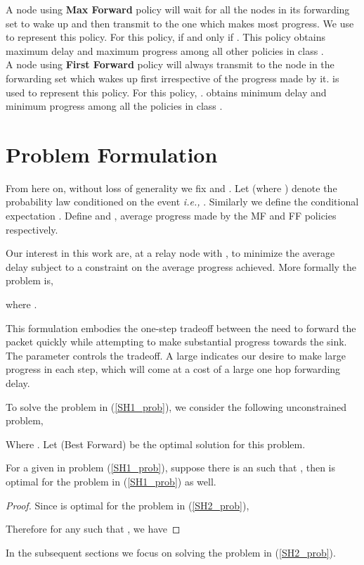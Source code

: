 \documentclass[onecolumn]{IEEEtran}
\begin{document}
\noindent
A node using \textbf{Max Forward} policy will wait for all the  nodes in its forwarding set to wake up and then transmit to the one which makes  most progress. We use  to represent this policy. For this policy,  if and only if . This policy obtains maximum delay and maximum progress  among all other policies in class .\\
A node using \textbf{First Forward} policy will always transmit to the
node in the forwarding set which wakes up first irrespective of the
progress made by it.  is used to represent this policy. For
this policy, .  obtains minimum
delay and minimum progress among all the policies in
class .

\section{Problem Formulation}
\label{problem_formulation}
From here on, without loss of generality we fix  and . Let
 (where ) denote the probability law conditioned
on the event  \emph{i.e.,}
. Similarly we define the
conditional expectation . Define
 and
, average progress made by the
MF and FF policies respectively.

Our interest in this work are, at a relay node  with , to
minimize the average delay subject to a constraint on the average
progress achieved.  More formally the problem is,

where . 

This formulation embodies the one-step tradeoff between the need to
forward the packet quickly while attempting to make substantial
progress towards the sink. The parameter  controls the
tradeoff. A large  indicates our desire to make large progress
in each step, which will come at a cost of a large one hop forwarding
delay.

To solve the problem in (\ref{SH1_prob}), we consider the following
unconstrained problem, 

Where .  Let  (Best Forward) be the optimal
solution for this problem.
\begin{lemma} \label{lem:conversion_to_mdp}
  For a given  in problem (\ref{SH1_prob}), suppose there is
  an  such that
  , then
   is optimal for the problem in
  (\ref{SH1_prob}) as well.
\end{lemma}
\begin{proof}
 Since  is optimal for the problem in (\ref{SH2_prob}), 

Therefore for any  such that , we have

\end{proof}
In the subsequent sections we focus on solving the problem in (\ref{SH2_prob}).
\end{document}

